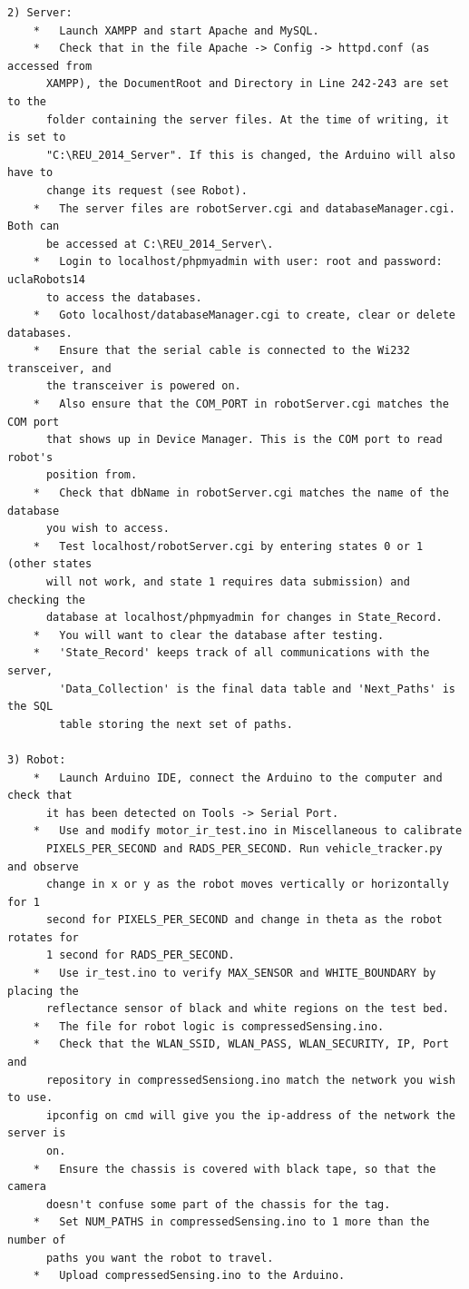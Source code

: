 \documentclass[english]{article}\usepackage[]{graphicx}\usepackage[]{color}
\begin{document}
\begin{appendix}
\begin{verbatim}
2) Server:
	*   Launch XAMPP and start Apache and MySQL.
	*   Check that in the file Apache -> Config -> httpd.conf (as accessed from
	  XAMPP), the DocumentRoot and Directory in Line 242-243 are set to the
	  folder containing the server files. At the time of writing, it is set to
	  "C:\REU_2014_Server". If this is changed, the Arduino will also have to
	  change its request (see Robot).
	*   The server files are robotServer.cgi and databaseManager.cgi. Both can
	  be accessed at C:\REU_2014_Server\.
	*   Login to localhost/phpmyadmin with user: root and password: uclaRobots14
	  to access the databases.
	*   Goto localhost/databaseManager.cgi to create, clear or delete databases.
	*   Ensure that the serial cable is connected to the Wi232 transceiver, and
	  the transceiver is powered on.
	*   Also ensure that the COM_PORT in robotServer.cgi matches the COM port
	  that shows up in Device Manager. This is the COM port to read robot's
	  position from.
	*   Check that dbName in robotServer.cgi matches the name of the database
	  you wish to access.
	*   Test localhost/robotServer.cgi by entering states 0 or 1 (other states
	  will not work, and state 1 requires data submission) and checking the
	  database at localhost/phpmyadmin for changes in State_Record.
	*   You will want to clear the database after testing.
	*   'State_Record' keeps track of all communications with the server,
		'Data_Collection' is the final data table and 'Next_Paths' is the SQL
		table storing the next set of paths.

3) Robot:
	*   Launch Arduino IDE, connect the Arduino to the computer and check that
	  it has been detected on Tools -> Serial Port.
	*   Use and modify motor_ir_test.ino in Miscellaneous to calibrate
	  PIXELS_PER_SECOND and RADS_PER_SECOND. Run vehicle_tracker.py and observe
	  change in x or y as the robot moves vertically or horizontally for 1
	  second for PIXELS_PER_SECOND and change in theta as the robot rotates for
	  1 second for RADS_PER_SECOND.
	*   Use ir_test.ino to verify MAX_SENSOR and WHITE_BOUNDARY by placing the
	  reflectance sensor of black and white regions on the test bed.
	*   The file for robot logic is compressedSensing.ino.
	*	Check that the WLAN_SSID, WLAN_PASS, WLAN_SECURITY, IP, Port and 
	  repository in compressedSensiong.ino match the network you wish to use.
	  ipconfig on cmd will give you the ip-address of the network the server is
	  on.
	*   Ensure the chassis is covered with black tape, so that the camera
	  doesn't confuse some part of the chassis for the tag.
	*   Set NUM_PATHS in compressedSensing.ino to 1 more than the number of
	  paths you want the robot to travel.
	*   Upload compressedSensing.ino to the Arduino.



\end{verbatim}
\end{appendix}
\end{document}
